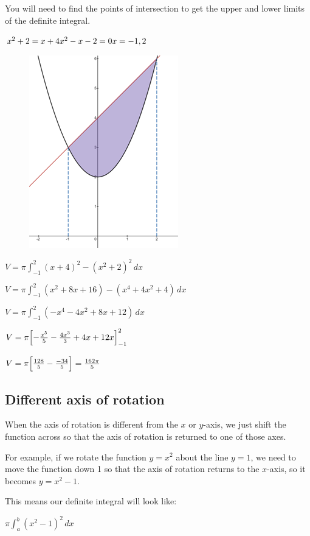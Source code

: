 \documentclass[../main.tex]{subfiles}
\begin{document}
You will need to find the points of intersection to get the upper and lower limits of the definite integral.

$x^2+2=x+4\\
x^2-x-2=0\\
x=-1, 2$

\begin{figure}[h!]
    \centering
    \includegraphics{images/volrev7.png}
\end{figure}

$V=\pi \int_{-1}^2 (x+4)^2 - (x^2+2)^2\,dx$

$V=\pi \int_{-1}^2 (x^2+8x+16) - (x^4+4x^2+4)\,dx$

$V=\pi \int_{-1}^2 (-x^4-4x^2+8x+12)\,dx$

$V=\pi \Bigl[-\frac{x^5}{5}-\frac{4x^3}{3}+4x+12x\Bigr]_{-1}^2$

$V=\pi \Bigl[\frac{128}{5}-\frac{-34}{5} \Bigr]=\frac{162\pi}{5}$

\subsection*{Different axis of rotation}
When the axis of rotation is different from the $x$ or $y$-axis, we just shift the function across so that the axis of rotation is returned to one of those axes.

For example, if we rotate the function $y=x^2$ about the line $y=1$, we need to move the function down 1 so that the axis of rotation returns to the $x$-axis, so it becomes $y=x^2-1$.

This means our definite integral will look like:

$\pi \int_a^b (x^2-1)^2\,dx$

\pagebreak
\end{document}
